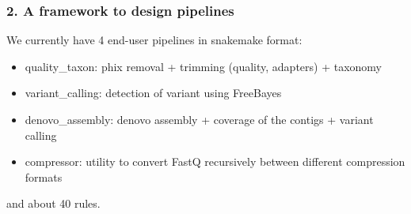 \documentclass{beamer}
\begin{document}
\begin{frame}[fragile]
    \frametitle{2. A framework to design pipelines}
    \tiny
    We currently have 4 end-user pipelines in snakemake format:
    \begin{block}{}
    \begin{itemize}
      \item quality\_taxon: phix removal + trimming (quality, adapters) + taxonomy
      \item variant\_calling: detection of variant  using FreeBayes
      \item denovo\_assembly: denovo assembly + coverage of the contigs + variant calling
      \item compressor: utility to convert FastQ recursively between different compression formats
    \end{itemize}
    
    \end{block}
    and about 40 rules. 
    

\end{frame}
\end{document}

